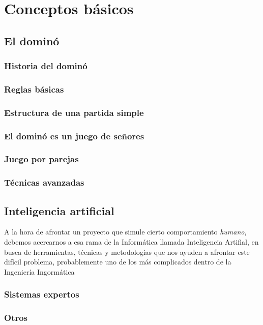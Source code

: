 

\section{Conceptos básicos}

\subsection{El dominó}

\subsubsection{Historia del dominó}

\subsubsection{Reglas básicas}
\subsubsection{Estructura de una partida simple}
\subsubsection{El dominó es un juego de señores}
\subsubsection{Juego por parejas}
\subsubsection{Técnicas avanzadas}

\subsection{Inteligencia artificial}

A la hora de afrontar un proyecto que simule cierto comportamiento \emph{humano}, debemos acercarnos a esa rama de la
Informática llamada Inteligencia Artifial, en busca de herramientas, técnicas y metodologías que nos ayuden a afrontar este
difícil problema, probablemente uno de los más complicados dentro de la Ingeniería Ingormática

\subsubsection{Sistemas expertos}
\subsubsection{Otros}
